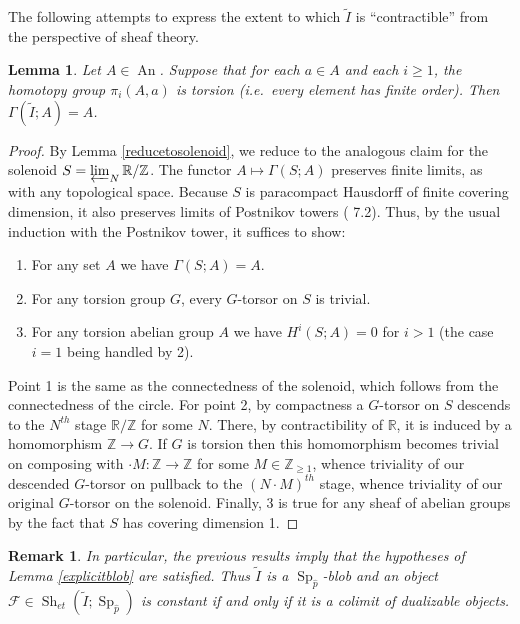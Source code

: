 \documentclass[12pt]{article}
\newtheorem{lemma}[theorem]{Lemma}
\newtheorem{remark}[theorem]{Remark}
\newcommand{\on}{\operatorname}
\newcommand{\mc}{\mathcal}
\newcommand{\wh}{\widehat}
\begin{document}
The following attempts to express the extent to which $\widetilde{I}$ is ``contractible'' from the perspective of sheaf theory.

\begin{lemma}\label{itscontractible}
Let $A\in\on{An}$.  Suppose that for each $a\in A$ and each $i\geq 1$, the homotopy group $\pi_i(A,a)$ is torsion (i.e.\ every element has finite order).  Then $\Gamma(\widetilde{I};A)=A$.
\end{lemma}
\begin{proof}
By Lemma \ref{reducetosolenoid}, we reduce to the analogous claim for the solenoid $S=\varprojlim_N \mathbb{R}/\mathbb{Z}$.  The functor $A\mapsto \Gamma(S;A)$ preserves finite limits, as with any topological space.  Because $S$ is paracompact Hausdorff of finite covering dimension, it also preserves limits of Postnikov towers (\cite{LurieHTT} 7.2).  Thus, by the usual induction with the Postnikov tower, it suffices to show:
\begin{enumerate}
\item For any set $A$ we have $\Gamma(S;A)=A$.
\item For any torsion group $G$, every $G$-torsor on $S$ is trivial.
\item For any torsion abelian group $A$ we have $H^i(S;A)=0$ for $i>1$ (the case $i=1$ being handled by 2).
\end{enumerate}
Point 1 is the same as the connectedness of the solenoid, which follows from the connectedness of the circle.  For point 2, by compactness a $G$-torsor on $S$ descends to the $N^{th}$ stage $\mathbb{R}/\mathbb{Z}$ for some $N$.  There, by contractibility of $\mathbb{R}$, it is induced by a homomorphism $\mathbb{Z}\rightarrow G$.  If $G$ is torsion then this homomorphism becomes trivial on composing with $\cdot M:\mathbb{Z}\rightarrow \mathbb{Z}$ for some $M\in\mathbb{Z}_{\geq 1}$, whence triviality of our descended $G$-torsor on pullback to the $(N\cdot M)^{th}$ stage, whence triviality of our original $G$-torsor on the solenoid.  Finally, 3 is true for any sheaf of abelian groups by the fact that $S$ has covering dimension 1.
\end{proof}

\begin{remark}\label{itsablob}
In particular, the previous results imply that the hypotheses of Lemma \ref{explicitblob} are satisfied.  Thus $\widetilde{I}$ is a $\on{Sp}_{\wh{p}}$-blob and an object $\mc{F}\in\on{Sh}_{et}(\widetilde{I};\on{Sp}_{\wh{p}})$ is constant if and only if it is a colimit of dualizable objects.  
\end{remark}
\end{document}

